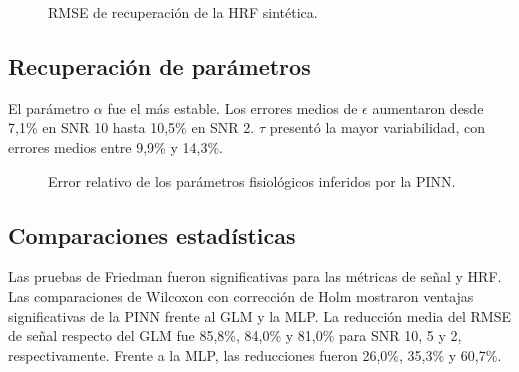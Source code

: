 \begin{figure}[H]
\centering
{}
\caption{RMSE de recuperación de la HRF sintética.}
\label{fig:synthetic_hrf_rmse}
\end{figure}

\subsection{Recuperación de parámetros}

El parámetro $\alpha$ fue el más estable. Los errores medios de $\epsilon$ aumentaron desde 7,1\% en SNR 10 hasta 10,5\% en SNR 2. $\tau$ presentó la mayor variabilidad, con errores medios entre 9,9\% y 14,3\%.

\begin{figure}[H]
\centering
{}
\caption{Error relativo de los parámetros fisiológicos inferidos por la PINN.}
\label{fig:synthetic_parameter_error}
\end{figure}

\subsection{Comparaciones estadísticas}

Las pruebas de Friedman fueron significativas para las métricas de señal y HRF. Las comparaciones de Wilcoxon con corrección de Holm mostraron ventajas significativas de la PINN frente al GLM y la MLP. La reducción media del RMSE de señal respecto del GLM fue 85,8\%, 84,0\% y 81,0\% para SNR 10, 5 y 2, respectivamente. Frente a la MLP, las reducciones fueron 26,0\%, 35,3\% y 60,7\%.
